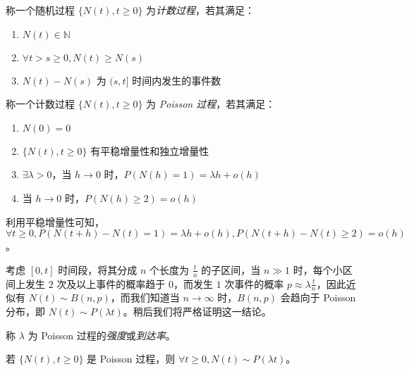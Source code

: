 \documentclass[../main.tex]{subfiles}
\begin{document}
\begin{definition}\label{def:6.1.2}
    称一个随机过程 $\{N(t),t\geq0\}$ 为\emph{计数过程}，若其满足：
    \begin{enumerate}
        \item $N(t)\in\mathbb N$
        \item $\forall t>s\geq0,N(t)\geq N(s)$
        \item $N(t)-N(s)$ 为 $(s,t]$ 时间内发生的事件数
    \end{enumerate}
\end{definition}

\begin{definition}\label{def:6.1.3}
    称一个计数过程 $\{N(t),t\geq0\}$ 为 \emph{Poisson 过程}，若其满足：
    \begin{enumerate}
        \item $N(0)=0$
        \item $\{N(t),t\geq0\}$ 有平稳增量性和独立增量性
        \item $\exists\lambda>0$，当 $h\rightarrow0$ 时，$P(N(h)=1)=\lambda h+o(h)$
        \item 当 $h\rightarrow0$ 时，$P(N(h)\geq2)=o(h)$
    \end{enumerate}
\end{definition}

利用平稳增量性可知，$\forall t\geq0,P(N(t+h)-N(t)=1)=\lambda h+o(h),P(N(t+h)-N(t)\geq2)=o(h)$。

考虑 $[0,t]$ 时间段，将其分成 $n$ 个长度为 $\frac tn$ 的子区间，当 $n\gg1$ 时，每个小区间上发生 $2$ 次及以上事件的概率趋于 $0$，而发生 $1$ 次事件的概率 $p\approx \lambda\frac tn$，因此近似有 $N(t)\sim B(n,p)$，而我们知道当 $n\rightarrow\infty$ 时，$B(n,p)$ 会趋向于 Poisson 分布，即 $N(t)\sim P(\lambda t)$。稍后我们将严格证明这一结论。

称 $\lambda$ 为 Poisson 过程的\emph{强度}或\emph{到达率}。

\begin{proposition}
    若 $\{N(t),t\geq0\}$ 是 Poisson 过程，则 $\forall t\geq0,N(t)\sim P(\lambda t)$。
\end{proposition}
\end{document}
